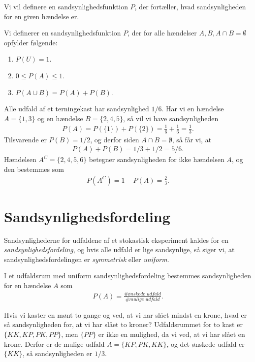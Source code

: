 Vi vil definere en sandsynlighedsfunktion $P$, der fortæller, hvad sandsynligheden for en given hændelse er.
\begin{defn}
Vi definerer en sandsynlighedsfunktion $P$, der for alle hændelser $A,B, A\cap B = \emptyset$ opfylder følgende:
\begin{enumerate}[label=\roman*)]
\item $P(U)=1$.
\item $0 \leq P(A) \leq 1$.
\item $P(A \cup B) = P(A) + P(B)$.
\end{enumerate}
\end{defn}
\begin{exa}
Alle udfald af et terningekast har sandsynlighed $1/6$. Har vi en hændelse $A= \{1,3\}$ og en hændelse $B= \{2,4,5\}$, så vil vi have sandsynligheden
\begin{align*}
P(A) = P(\{1\}) + P(\{2\}) =  \frac{1}{6} + \frac{1}{6} = \frac{1}{3}.
\end{align*}
Tilsvarende er $P(B) = 1/2$, og derfor siden $A \cap B = \emptyset$, så får vi, at
\begin{align*}
P(A)+P(B) = 1/3+1/2 = 5/6.
\end{align*}
Hændelsen $A^C=\{2,4,5,6\}$ betegner sandsynligheden for ikke hændelsen $A$, og den bestemmes som
\begin{align*}
P(A^C) = 1-P(A) = \frac{2}{3}.
\end{align*}  
\end{exa}
\section*{Sandsynlighedsfordeling}

Sandsynlighederne for udfaldene af et stokastisk eksperiment kaldes for en \textit{sandsynlighedsfordeling}, og hvis alle udfald er lige sandsynlige, så siger vi, at sandsynlighedsfordelingen er \textit{symmetrisk} eller \textit{uniform}.
\begin{setn}
I et udfaldsrum med uniform sandsynlighedsfordeling bestemmes sandsynligheden for en hændelse $A$ som
\begin{align*}
P(A) = \frac{\# \textit{ønskede udfald}}{\# \textit{mulige udfald}}.
\end{align*}
\end{setn}
\begin{exa}
Hvis vi kaster en mønt to gange og ved, at vi har slået mindst en krone, hvad er så sandsynligheden for, at vi har slået to kroner?
Udfaldsrummet for to kast er $\{KK,KP,PK,PP\}$, men $\{PP\}$ er ikke en mulighed, da vi ved, at vi har slået en krone. Derfor er de mulige udfald $A=\{KP,PK,KK\}$, og det ønskede udfald er $\{KK\}$, så sandsynligheden er $1/3$. 
\end{exa}

